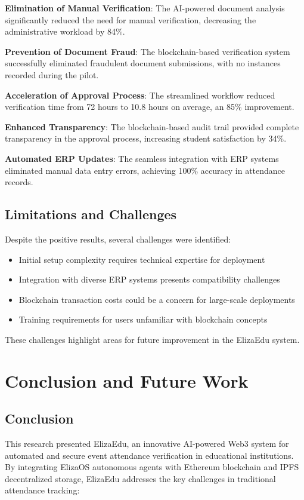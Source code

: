 \documentclass[a4paper,12pt]{article}
\begin{document}
\textbf{Elimination of Manual Verification}: The AI-powered document analysis significantly reduced the need for manual verification, decreasing the administrative workload by 84\%.

\textbf{Prevention of Document Fraud}: The blockchain-based verification system successfully eliminated fraudulent document submissions, with no instances recorded during the pilot.

\textbf{Acceleration of Approval Process}: The streamlined workflow reduced verification time from 72 hours to 10.8 hours on average, an 85\% improvement.

\textbf{Enhanced Transparency}: The blockchain-based audit trail provided complete transparency in the approval process, increasing student satisfaction by 34\%.

\textbf{Automated ERP Updates}: The seamless integration with ERP systems eliminated manual data entry errors, achieving 100\% accuracy in attendance records.

\subsection{Limitations and Challenges}
Despite the positive results, several challenges were identified:

\begin{itemize}
    \item Initial setup complexity requires technical expertise for deployment
    \item Integration with diverse ERP systems presents compatibility challenges
    \item Blockchain transaction costs could be a concern for large-scale deployments
    \item Training requirements for users unfamiliar with blockchain concepts
\end{itemize}

These challenges highlight areas for future improvement in the ElizaEdu system.

\section{Conclusion and Future Work}
\subsection{Conclusion}
This research presented ElizaEdu, an innovative AI-powered Web3 system for automated and secure event attendance verification in educational institutions. By integrating ElizaOS autonomous agents with Ethereum blockchain and IPFS decentralized storage, ElizaEdu addresses the key challenges in traditional attendance tracking:
\end{document}
